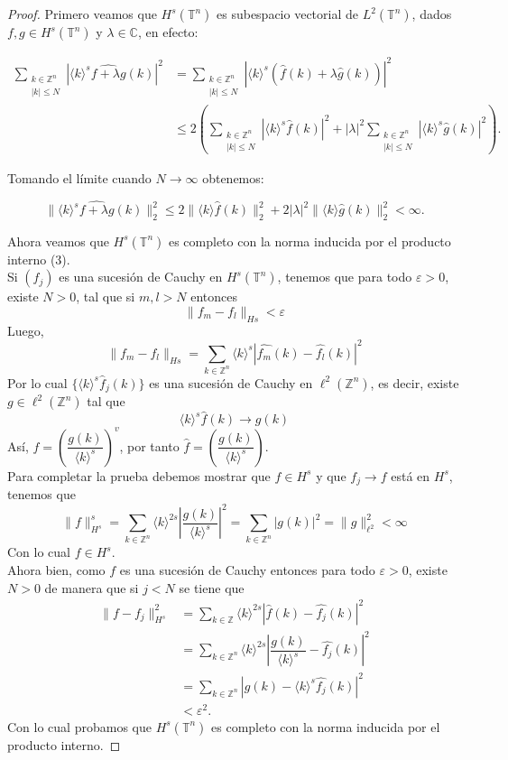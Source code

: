 \documentclass[12pt]{article}
\newcommand\Z{\ensuremath{\mathbb{Z}}}
\newcommand\C{\ensuremath{\mathbb{C}}}
\newcommand\T{\mathbb{T}}
\renewcommand{\epsilon}{\varepsilon}
\renewcommand{\hat}{\widehat}
\begin{document}
\begin{proof}
Primero veamos que $H^s(\T^n)$ es subespacio vectorial de $L^2(\T^n)$, dados $f,g\in H^s(\T^n)$ y $\lambda\in \C$, en efecto:

\begin{align*}
    \sum_{\substack{k\in \Z^n\\
    |k|\leq N}}|\langle k\rangle^s \hat{f+\lambda g}(k)|^2&=\sum_{\substack{k\in \Z^n\\
    |k|\leq N}}|\langle k\rangle^s( \hat{f}(k)+\lambda \hat{g}(k))|^2\\
    &\leq2\left(\sum_{\substack{k\in \Z^n\\
    |k|\leq N}}|\langle k\rangle^s\hat{f}(k)|^2+|\lambda|^2\sum_{\substack{k\in \Z^n\\
    |k|\leq N}}|\langle k\rangle^s \hat{g}(k)|^2\right)
.\end{align*}

Tomando el límite cuando $N\to \infty$ obtenemos:

$$\|\langle k\rangle^s\hat{f+\lambda g}(k)\|_2^2\leq2 \|\langle k\rangle\hat{f}(k)\|_2^2+2|\lambda|^2\|\langle k\rangle\hat{g}(k)\|_2^2<\infty.$$

Ahora veamos que $H^s(\T^n)$ es completo con la norma inducida por el producto interno (3).\\

Si $(f_j)$ es una sucesión de Cauchy en $H^s(\T^n)$, tenemos que para todo $\varepsilon> 0$, existe $N>0$, tal que si $m,l>N$ entonces
$$\| f_m-f_l\|_{H{s}}< \epsilon $$
Luego, $$\| f_m-f_l\|_{H{s}}=\displaystyle\sum_{k\in \Z^{n}}\langle k\rangle ^{s}|\widehat{f_{m}}(k)-\widehat{f_{l}}(k)|^{2}$$
Por lo cual $\{\langle k \rangle^{s}\widehat{f}_j(k)\}$ es una sucesión de Cauchy en $\ell^{2}(\Z^{n})$, es decir, existe $g\in \ell^{2}(\Z^{n}) $ tal que
$$\langle k \rangle ^{s}\hat{f}(k)\rightarrow g(k)$$
Así, $f=\left(\dfrac{g(k)}{\langle k \rangle^{s}}\right)^{v}$, por tanto $\hat{f}=\left(\dfrac{g(k)}{\langle k \rangle^{s}}\right)$.\\

Para completar la prueba debemos mostrar que $f\in H^{s}$ y que $f_{j}\rightarrow f$ está en $H^{s}$, tenemos que 
$$\|f\|^{s}_{H^{s}}=\displaystyle\sum_{k\in \Z ^{n}} \langle k \rangle^{2s}\left| \dfrac{g(k)}{\langle k\rangle^{s}}\right|^{2}=\displaystyle\sum_{k\in \Z^{n}}|g(k)|^{2}=\|g\|^{2}_{\ell^{2}}<\infty$$
Con lo cual $f\in H^{s}$.\\
Ahora bien, como $f$ es una sucesión de Cauchy entonces para todo $\epsilon>0$, existe $N>0$ de manera que si $j<N$ se tiene que
\begin{align*}
   \|f-f_j\|_{H^{s}}^{2}&=\sum_{k\in \Z}\langle k \rangle^{2s}|\hat{f}(k)-\hat{f_j}(k)|^{2}\\
   &=\sum_{k\in \Z^{n}} \langle k\rangle^{2s}\left| \dfrac{g(k)}{\langle k \rangle^{s}}-  \hat{f_j}(k) \right|^{2} \\
   &= \sum_{k\in \Z^{n}} \left| g(k)- \langle k\rangle^{s} \hat{f_j}(k) \right|^{2} \\
   &< \epsilon^{2}
.\end{align*}
Con lo cual probamos que $H^{s}(\T^{n})$ es completo con la norma inducida por el producto interno.


\end{proof}
\end{document}

